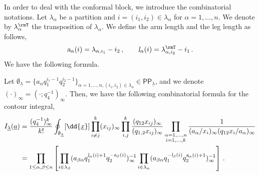 In order to deal with the conformal block, we introduce the combinatorial notations.
Let $\lambda_\alpha$ be a partition and $i = (i_1,i_2) \in \lambda_\alpha$ for $\alpha = 1, \ldots, n$.
We denote by $\lambda_\alpha^\rmT$ the transposition of $\lambda_\alpha$.
We define the arm length and the leg length as follows,
    \begin{align}
        \textsl{a}_\alpha(i) = \lambda_{\alpha,i_1} - i_2
        \, , \qquad 
        \textsl{l}_\alpha(i) = \lambda_{\alpha,i_2}^\rmT - i_1
        \, .
    \end{align}
We have the following formula.
\begin{lemma}
    Let $\emptyset_{\underline{\lambda}} = \{ a_\alpha q_1^{i_1-1} q_2^{i_2-1} \}_{\alpha=1,\ldots,n,(i_1,i_2) \in \lambda_\alpha} \in \mathsf{PP}_{\underline{\lambda}}$, and we denote $(\cdot)_\infty = (\cdot;q_4^{-1})_\infty$.
    Then, we have the following combinatorial formula for the contour integral,
    \begin{align}
    I_{\underline{\lambda}} (\underline{a}) 
    & = \frac{(q_4^{-1})_\infty^k}{k!} \oint_{\emptyset_{\underline{\lambda}}} [\dd{\underline{x}}] \prod_{i \neq j}^k (x_{ij})_\infty \prod_{i,j}^k \frac{(q_{12} x_{ij})_\infty}{(q_{1,2} x_{ij})_\infty} \prod_{\substack{\alpha = 1,\ldots,n \\ i = 1, \ldots, k}} \frac{1}{(a_\alpha / x_i)_\infty(q_{12} x_i / a_\alpha)_\infty}
    \nonumber \\ &  
    = \prod_{1 \le \alpha,\beta \le n} \left[ \prod_{i \in \lambda_\beta} (a_{\beta \alpha} q_1^{\textsl{l}_\alpha(i) + 1} q_2^{-\textsl{a}_\beta(i)})^{-1}_\infty \prod_{i \in \lambda_\alpha} (a_{\beta \alpha} q_1^{-\textsl{l}_\beta(i)} q_2^{\textsl{a}_\alpha(i)+1})^{-1}_\infty \right]
    \, .
\end{align}
\end{lemma}
